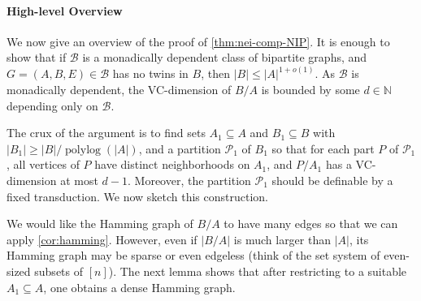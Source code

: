 \documentclass[11pt]{article}
\theoremstyle{definition}
\newcommand{\BB}{{\mathscr B}}
\newcommand{\N}{\mathbb{N}}
\newcommand{\inducedSS}[2]{#1/#2}%
\renewcommand{\le}{\leqslant}
\renewcommand{\ge}{\geqslant}
\renewcommand{\subset}{\subseteq}
\renewcommand{\cal}{\mathcal}
\DeclareMathOperator{\polylog}{polylog}
\DeclareMathOperator{\subpoly}{subpoly}
\begin{document}
  

\paragraph{High-level Overview} We now give an overview of the 
proof of \cref{thm:nei-comp-NIP}.
It is enough to show that if $\BB$ is a monadically dependent class of bipartite graphs, and $G=(A,B,E) \in \BB$ has no twins in $B$, then $|B|\le |A|^{1+o(1)}$.
As $\BB$ is monadically dependent, 
the VC-dimension of $\inducedSS{B}{A}$ is bounded by some $d\in\N$  depending only on $\BB$.


The crux of the argument is to find sets $A_1\subset A$ and $B_1\subset B$ with $|B_1|\ge |B|/\polylog(|A|)$, and a partition $\cal P_1$ of $B_1$ so that for each part $P$ of $\cal P_1$,
all vertices of $P$ have distinct neighborhoods on $A_1$, and $\inducedSS{P}{A_1}$ has a VC-dimension at most $d-1$. Moreover, the partition $\cal P_1$ should be definable by a fixed transduction. We now sketch this construction.

We would like the Hamming graph of $\inducedSS{B}{A}$ to have many edges so that we can apply \cref{cor:hamming}. However, even if $|\inducedSS{B}{A}|$ is much larger than $|A|$, its Hamming graph may be sparse or even edgeless
(think of the set system of even-sized subsets of $[n]$). 
The next lemma shows that after restricting to a suitable $A_1\subseteq A$, one obtains a dense Hamming graph.
\end{document}
